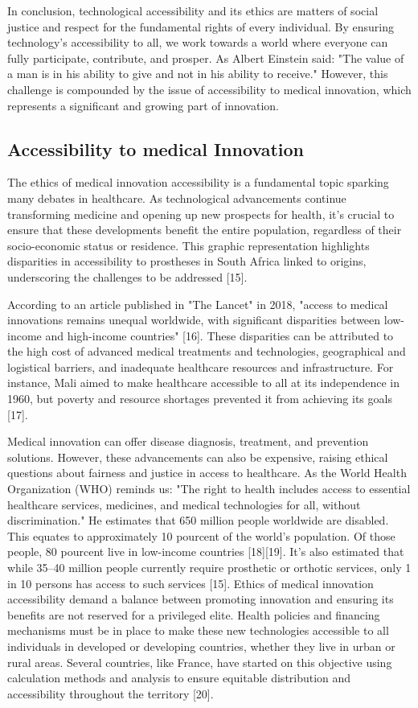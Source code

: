 In conclusion, technological accessibility and its ethics are matters of social justice and respect for the fundamental rights of every individual. By ensuring technology's accessibility to all, we work towards a world where everyone can fully participate, contribute, and prosper. As Albert Einstein said: "The value of a man is in his ability to give and not in his ability to receive."
However, this challenge is compounded by the issue of accessibility to medical innovation, which represents a significant and growing part of innovation.

\subsection{Accessibility to medical Innovation}
The ethics of medical innovation accessibility is a fundamental topic sparking many debates in healthcare. As technological advancements continue transforming medicine and opening up new prospects for health, it’s crucial to ensure that these developments benefit the entire population, regardless of their socio-economic status or residence. This graphic representation highlights disparities in accessibility to prostheses in South Africa linked to origins, underscoring the challenges to be addressed [15].


According to an article published in "The Lancet" in 2018, "access to medical innovations remains unequal worldwide, with significant disparities between low-income and high-income countries" [16]. These disparities can be attributed to the high cost of advanced medical treatments and technologies, geographical and logistical barriers, and inadequate healthcare resources and infrastructure. For instance, Mali aimed to make healthcare accessible to all at its independence in 1960, but poverty and resource shortages prevented it from achieving its goals [17].

Medical innovation can offer disease diagnosis, treatment, and prevention solutions. However, these advancements can also be expensive, raising ethical questions about fairness and justice in access to healthcare. As the World Health Organization (WHO) reminds us: "The right to health includes access to essential healthcare services, medicines, and medical technologies for all, without discrimination." He estimates that 650 million people worldwide are disabled. This equates to approximately 10 pourcent of the world’s population. Of those people, 80 pourcent live in low-income countries [18][19]. It’s also estimated that while 35–40 million people currently require prosthetic or orthotic services, only 1 in 10 persons has access to such services [15]. Ethics of medical innovation accessibility demand a balance between promoting innovation and ensuring its benefits are not reserved for a privileged elite. Health policies and financing mechanisms must be in place to make these new technologies accessible to all individuals in developed or developing countries, whether they live in urban or rural areas. Several countries, like France, have started on this objective using calculation methods and analysis to ensure equitable distribution and accessibility throughout the territory [20].

